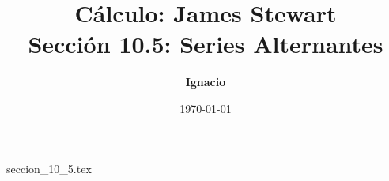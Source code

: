 \documentclass[11pt,spanish,oneside]{report}
\title{\textbf{Cálculo: James Stewart} \\ \Large Sección 10.5: Series Alternantes}
\author{\textbf{Ignacio}}
\date{\today}
\begin{document}
\maketitle

{seccion_10_5.tex}
\end{document}

